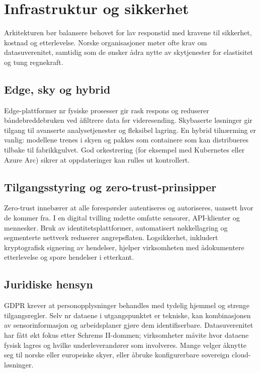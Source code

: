 \section{Infrastruktur og sikkerhet}
Arkitekturen b\o r balansere behovet for lav responstid med kravene til sikkerhet, kostnad og etterlevelse. Norske organisasjoner m\o ter ofte krav om datasuverenitet, samtidig som de \o nsker \aa dra nytte av skytjenester for elastisitet og tung regnekraft.

\subsection{Edge, sky og hybrid}
Edge-plattformer n\a r fysiske prosesser gir rask respons og reduserer b\aa ndebreddebruken ved \aa filtrere data f\o r videresending. Skybaserte løsninger gir tilgang til avanserte analysetjenester og fleksibel lagring. En hybrid tilnærming er vanlig: modellene trenes i skyen og pakkes som containere som kan distribueres tilbake til fabrikkgulvet. God orkestrering (for eksempel med Kubernetes eller Azure Arc) sikrer at oppdateringer kan rulles ut kontrollert.

\subsection{Tilgangsstyring og zero-trust-prinsipper}
Zero-trust inneb\ae rer at alle foresp\o rsler autentiseres og autoriseres, uansett hvor de kommer fra. I en digital tvilling m\a dette omfatte sensorer, API-klienter og mennesker. Bruk av identitetsplattformer, automatisert n\o kkellagring og segmenterte nettverk reduserer angrepsflaten. Logsikkerhet, inkludert kryptografisk signering av hendelser, hjelper virksomheten med \aa dokumentere etterlevelse og spore hendelser i etterkant.

\subsection{Juridiske hensyn}
GDPR krever at personopplysninger behandles med tydelig hjemmel og strenge tilgangsregler. Selv n\a r dataene i utgangspunktet er tekniske, kan kombinasjonen av sensorinformasjon og arbeidsplaner gj\o re dem identifiserbare. Datasuverenitet har f\aa tt \o kt fokus etter Schrems II-dommen; virksomheter m\aa vite hvor dataene fysisk lagres og hvilke underleverand\o rer som involveres. Mange velger \aa knytte seg til norske eller europeiske skyer, eller \aa bruke konfigurerbare sovereign cloud-l\o sninger.

